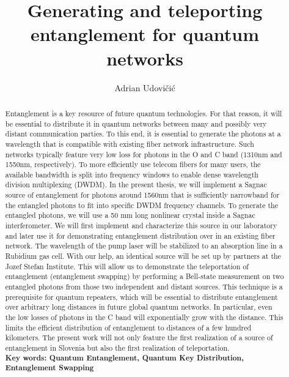 \documentclass{article}
\title{Generating and teleporting entanglement for quantum networks}
\author{Adrian Udovičić}
\date{}
\theoremstyle{mytheoremstyle}
\theoremstyle{mytheoremstyle}
\theoremstyle{myproblemstyle}
\begin{document}
\maketitle
\newpage


\begin{abstract}
Entanglement is a key resource of future quantum technologies. For that reason, it will be essential to distribute 
it in quantum networks between many and possibly very distant communication parties. To this end, it is essential 
to generate the photons at a wavelength that is compatible with existing fiber network infrastructure. Such networks typically feature 
very low loss for photons in the O and C band (1310nm and 1550nm, respectively). To more 
efficiently use telecom fibers for many users, the available bandwidth is split into frequency windows to enable dense wavelength 
division multiplexing (DWDM). In the present thesis, we will implement a Sagnac source of entanglement for photons around 1560nm 
that is sufficiently narrowband for the entangled photons to fit into specific DWDM frequency channels. To generate the 
entangled photons, we will use a 50 mm long nonlinear crystal inside a Sagnac interferometer. We will first 
implement and characterize this source in our laboratory and later use it for demonstrating entanglement distribution over in an existing 
fiber network. The wavelength of the pump laser will be stabilized to an absorption line in a Rubidium gas cell. 
With our help, an identical source will be set up by partners at the Jozef Stefan Institute. This will allow us to demonstrate the teleportation of entanglement 
(entanglement swapping) by performing a Bell-state measurement on two entangled photons from those two independent and distant sources. This technique is a prerequisite for quantum 
repeaters, which will be essential to distribute entanglement over arbitrary long distances in future global quantum networks. In particular, even the low losses of photons in 
the C band will exponentially grow with the distance. This limits the efficient distribution of entanglement to distances of a few hundred kilometers.
The present work will not only feature the first realization of a source of entanglement in Slovenia but also the first realization of teleportation.\\
\textbf{Key words: Quantum Entanglement, Quantum Key Distribution, Entanglement Swapping}
\end{abstract}

\newpage
\tableofcontents
\newpage
\end{document}
